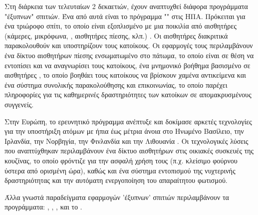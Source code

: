 \par
Στη διάρκεια των τελευταίων 2 δεκαετιών, έχουν αναπτυχθεί διάφορα προγράμματα "έξυπνων" σπιτιών.
Ένα από αυτά είναι το πρόγραμμα "" στις ΗΠΑ. Πρόκειται για ένα τριώροφο σπίτι, το οποίο είναι εξοπλισμένο με μια ποικιλία από αισθητήρες (κάμερες, μικρόφωνα, , αισθητήρες πίεσης,  κλπ.) \cite{aware_home}.
Οι αισθητήρες διακριτικά παρακολουθούν και υποστηρίζουν τους κατοίκους.
Οι εφαρμογές τους περιλαμβάνουν ένα δίκτυο αισθητήρων πίεσης ενσωματωμένο στο πάτωμα, το οποίο είναι σε θέση να εντοπίσει και να αναγνωρίσει τους κατοίκους, ένα μνημονικό βοήθημα βασισμένο σε αισθητήρες , το οποίο βοηθάει τους κατοίκους να βρίσκουν χαμένα αντικείμενα και ένα σύστημα συνολικής παρακολούθησης και επικοινωνίας, το οποίο παρέχει πληροφορίες για τις καθημερινές δραστηριότητες των κατοίκων σε απομακρυσμένους συγγενείς.
\par
Στην Ευρώπη, το ερευνητικό πρόγραμμα  ανέπτυξε και δοκίμασε αρκετές τεχνολογίες για την υποστήριξη ατόμων με ήπια έως μέτρια άνοια στο Ηνωμένο Βασίλειο, την Ιρλανδία, την Νορβηγία, την Φινλανδία και την Λιθουανία \cite{Adlam2004}\cite{Cahill2007}.
Οι τεχνολογικές λύσεις που αναπτύχθηκαν περιλαμβάνουν ένα δίκτυο αισθητήρων στις οικιακές συσκευές της κουζίνας, το οποίο φρόντιζε για την ασφαλή χρήση τους (π.χ. κλείσιμο φούρνου ύστερα από ορισμένη ώρα), καθώς και ένα σύστημα εντοπισμού της νυχτερινής δραστηριότητας και την αυτόματη ενεργοποίηση του απαραίτητου φωτισμού. 
\par
Άλλα γνωστά παραδείγματα εφαρμογών 'έξυπνων' σπιτιών περιλαμβάνουν τα προγράμματα:  \cite{Cook2013},  \cite{Das2004},  \cite{yamazaki2007},  \cite{Orpwood2004} και το  \cite{Klack2011}.

